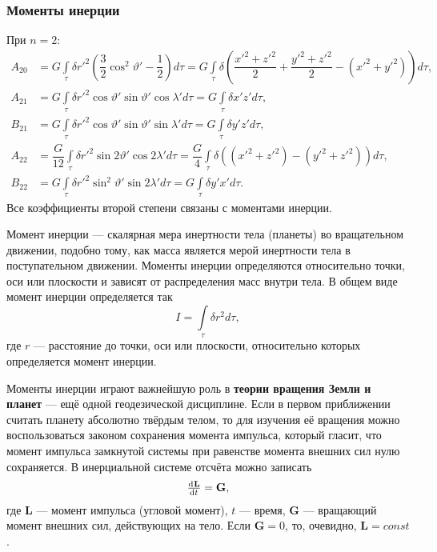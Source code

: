 \documentclass[11pt, a4paper,addpoints]{exam}
\theoremstyle{remark}
\renewcommand{\theta}{\vartheta}
\begin{document}
    \subsubsection*{Моменты инерции}
    При $n = 2$:
    \begin{align*}
        A_{20} &= G \int\limits_\tau \delta r'^2 \left( \dfrac{3}{2}\cos^2{\theta'} - \dfrac{1}{2} \right)d\tau =
        G \int\limits_\tau \delta \left(\dfrac{x'^2 + z'^2}{2} + \dfrac{y'^2 + z'^2}{2} - \left(
        x'^2 + y'^2 \right)\right) d\tau, \\
        A_{21} &= G \int\limits_\tau \delta r'^2 \cos{\theta'}\sin{\theta'} \cos{\lambda'} d\tau =
        G\int\limits_\tau \delta x'z' d\tau, \\
        B_{21} &= G \int\limits_\tau \delta r'^2 \cos{\theta'}\sin{\theta'} \sin{\lambda'} d\tau =
        G\int\limits_\tau \delta y'z' d\tau, \\
        A_{22} &= \dfrac{G}{12} \int\limits_\tau \delta r'^2 \sin{2\theta'} \cos{2\lambda'} d\tau =
        \dfrac{G}{4}\int\limits_\tau \delta \left( \left( x'^2 + z'^2 \right) - 
        \left( y'^2 + z'^2 \right) \right)  d\tau, \\
        B_{22} &= G \int\limits_\tau \delta r'^2 \sin^2{\theta'} \sin{2\lambda'} d\tau =
        G\int\limits_\tau \delta y'x' d\tau.
    \end{align*}
    Все коэффициенты второй степени связаны с моментами инерции.

    Момент инерции --- скалярная мера инертности тела (планеты) во вращательном движении, подобно тому, как
    масса является мерой инертности тела в поступательном движении. Моменты инерции определяются
    относительно точки, оси или плоскости и зависят от распределения масс внутри тела. В общем виде
    момент инерции определяется так
    \begin{equation*}
        I = \int\limits_{\tau}\delta r^2 d\tau,
    \end{equation*}
    где $r$ --- расстояние до точки, оси или плоскости, относительно которых определяется момент
    инерции.

    Моменты инерции играют важнейшую роль в \textbf{теории вращения Земли и планет} --- ещё
    одной геодезической дисциплине. Если в первом приближении считать планету абсолютно твёрдым
    телом, то для изучения её вращения можно воспользоваться законом сохранения момента
    импульса, который гласит, что момент импульса замкнутой системы при равенстве момента внешних
    сил нулю сохраняется. В инерциальной системе отсчёта можно записать
    \begin{equation*}
        \od{\mathbf{L}}{t} = \mathbf{G},
    \end{equation*}
    где $\mathbf{L}$ --- момент импульса (угловой момент), $t$ --- время, $\mathbf{G}$ --- 
    вращающий момент внешних сил, действующих на тело. Если $\mathbf{G} = 0$, 
    то, очевидно, $\mathbf{L} = const$. 
\end{document}
